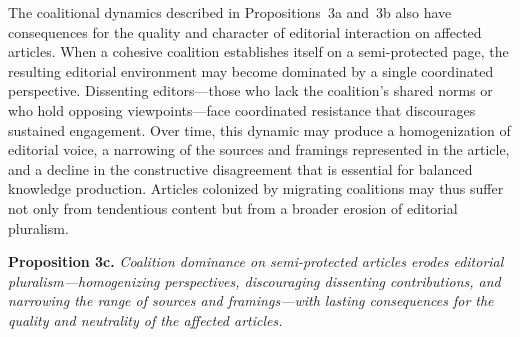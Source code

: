 \documentclass[11pt]{article}
\begin{document}
\smallskip
The coalitional dynamics described in Propositions~3a and~3b also have consequences for the quality and character of editorial interaction on affected articles. When a cohesive coalition establishes itself on a semi-protected page, the resulting editorial environment may become dominated by a single coordinated perspective. Dissenting editors---those who lack the coalition's shared norms or who hold opposing viewpoints---face coordinated resistance that discourages sustained engagement. Over time, this dynamic may produce a homogenization of editorial voice, a narrowing of the sources and framings represented in the article, and a decline in the constructive disagreement that is essential for balanced knowledge production. Articles colonized by migrating coalitions may thus suffer not only from tendentious content but from a broader erosion of editorial pluralism.

\smallskip
\noindent\textbf{Proposition 3c.} \emph{Coalition dominance on semi-protected articles erodes editorial pluralism---homogenizing perspectives, discouraging dissenting contributions, and narrowing the range of sources and framings---with lasting consequences for the quality and neutrality of the affected articles.}
\end{document}
